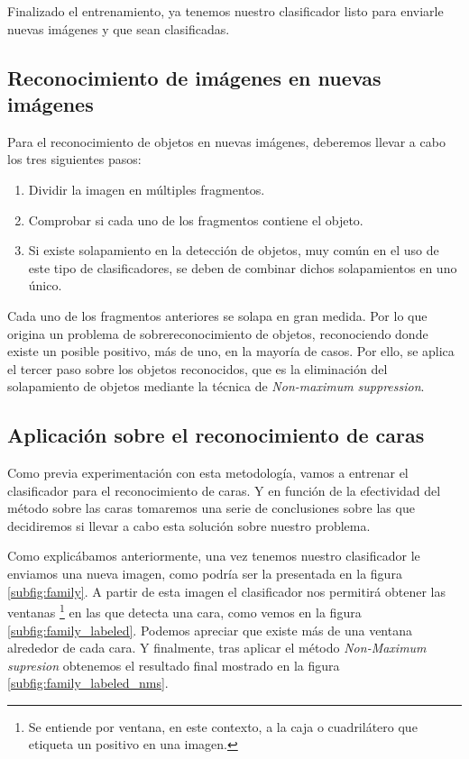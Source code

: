  Finalizado el entrenamiento, ya tenemos nuestro clasificador listo para enviarle nuevas imágenes y que sean clasificadas.
 
\subsection{Reconocimiento de imágenes en nuevas imágenes}
Para el reconocimiento de objetos en nuevas imágenes, deberemos llevar a cabo los tres siguientes pasos:

\begin{enumerate}[1.]
  \item Dividir la imagen en múltiples fragmentos.
  \item Comprobar si cada uno de los fragmentos contiene el objeto.
  \item Si existe solapamiento en la detección de objetos, muy común en el uso de este tipo de clasificadores, se deben de combinar dichos solapamientos en uno único.
\end{enumerate}

Cada uno de los fragmentos anteriores se solapa en gran medida. Por lo que origina un problema de sobrereconocimiento de objetos, reconociendo donde existe un posible positivo, más de uno, en la mayoría de casos. Por ello, se aplica el tercer paso sobre los objetos reconocidos, que es la eliminación del solapamiento de objetos mediante la técnica de \textit{Non-maximum suppression}.

\subsection{Aplicación sobre el reconocimiento de caras}

Como previa experimentación con esta metodología, vamos a entrenar el clasificador para el reconocimiento de caras. Y en función de la efectividad del método sobre las caras tomaremos una serie de conclusiones sobre las que decidiremos si llevar a cabo esta solución sobre  nuestro problema.

Como explicábamos anteriormente, una vez tenemos nuestro clasificador le enviamos una nueva imagen, como podría ser la presentada en la figura \ref{subfig:family}. A partir de esta imagen el clasificador nos permitirá obtener las ventanas \footnote{Se entiende por ventana, en este contexto, a la caja o cuadrilátero que etiqueta un positivo en una imagen.} en las que detecta una cara, como vemos en la figura \ref{subfig:family_labeled}. Podemos apreciar que existe más de una ventana alrededor de cada cara. Y finalmente, tras aplicar el método \textit{Non-Maximum supresion} obtenemos el resultado final mostrado en la figura \ref{subfig:family_labeled_nms}.

